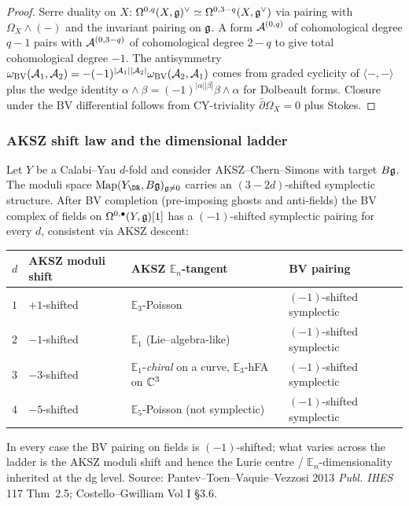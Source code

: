 \begin{proof}
Serre duality on $X$:
$\Omega^{0,q}(X,\mathfrak{g})^\vee \simeq \Omega^{0,3-q}(X,\mathfrak{g}^\vee)$ via pairing
with $\Omega_X \wedge (-)$ and the invariant pairing on $\mathfrak{g}$. A form
$\mathcal{A}^{(0,q)}$ of cohomological degree $q - 1$ pairs with
$\mathcal{A}^{(0,3-q)}$ of cohomological degree $2 - q$ to give total
cohomological degree $-1$. The antisymmetry
$\omega_{\mathrm{BV}}(\mathcal{A}_1,\mathcal{A}_2) = -(-1)^{|\mathcal{A}_1||\mathcal{A}_2|}\omega_{\mathrm{BV}}(\mathcal{A}_2,\mathcal{A}_1)$
comes from graded cyclicity of $\langle-,-\rangle$ plus the wedge
identity $\alpha\wedge\beta = (-1)^{|\alpha||\beta|}\beta\wedge\alpha$
for Dolbeault forms. Closure under the BV differential follows from
CY-triviality $\bar\partial\Omega_X = 0$ plus Stokes.
\end{proof}

\subsubsection{AKSZ shift law and the dimensional ladder}

\begin{theorem}\ClaimStatusTheorem
\label{opus13:thm:aksz-shift}
Let $Y$ be a Calabi--Yau $d$-fold and consider AKSZ--Chern--Simons with
target $B\mathfrak{g}$. The moduli space $\mathrm{Map}(Y_{\DR}, B\fg)_{\fg\neq 0}$
carries an $(3-2d)$-shifted symplectic structure. After BV completion
(pre-imposing ghosts and anti-fields) the BV complex of fields on
$\Omega^{0,\bullet}(Y,\mathfrak{g})[1]$ has a $(-1)$-shifted symplectic pairing
for every $d$, consistent via AKSZ descent:
\begin{center}
\begin{tabular}{@{}llll@{}}
$d$ & AKSZ moduli shift & AKSZ $\mathbb E_n$-tangent & BV pairing \\
\hline
$1$ & $+1$-shifted & $\mathbb E_3$-Poisson & $(-1)$-shifted symplectic \\
$2$ & $-1$-shifted & $\mathbb E_1$ (Lie--algebra-like) & $(-1)$-shifted symplectic \\
$3$ & $-3$-shifted & $\mathbb E_1$-\textit{chiral} on a curve, $\mathbb E_3$-hFA on $\mathbb{C}^3$ & $(-1)$-shifted symplectic \\
$4$ & $-5$-shifted & $\mathbb E_5$-Poisson (not symplectic) & $(-1)$-shifted symplectic
\end{tabular}
\end{center}
In every case the BV pairing on fields is $(-1)$-shifted; what varies
across the ladder is the AKSZ moduli shift and hence the Lurie
centre / $\mathbb E_n$-dimensionality inherited at the dg level.
Source: Pantev--Toen--Vaquie--Vezzosi 2013 \emph{Publ. IHES} 117
Thm~2.5; Costello--Gwilliam Vol I §3.6.
\end{theorem}


